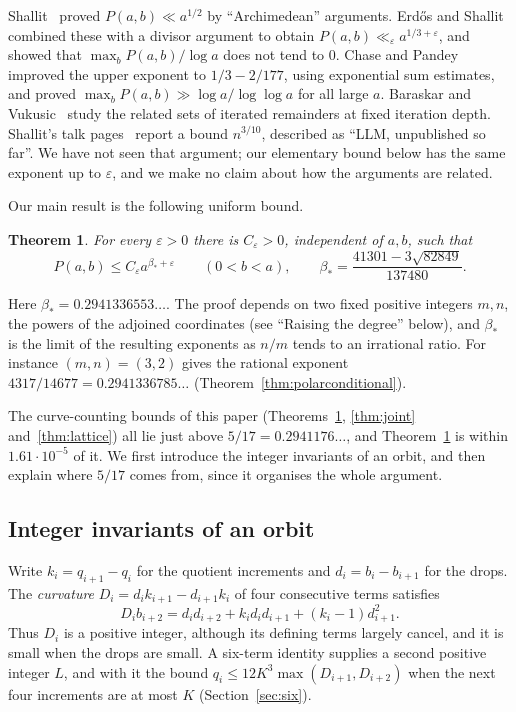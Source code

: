 \documentclass[11pt]{article}
\newtheorem{theorem}{Theorem}[section]
\theoremstyle{definition}
\theoremstyle{remark}
\begin{document}
Shallit~\cite{Shallit86} proved $P(a,b)\ll a^{1/2}$ by ``Archimedean'' arguments.
Erd\H{o}s and Shallit~\cite{ES} combined these with a divisor argument to obtain
$P(a,b)\ll_\varepsilon a^{1/3+\varepsilon}$, and showed that
$\max_bP(a,b)/\log a$ does not tend to $0$. Chase and Pandey~\cite{CP} improved
the upper exponent to $1/3-2/177$, using exponential sum estimates, and proved
$\max_bP(a,b)\gg\log a/\log\log a$ for all large $a$.
Baraskar and Vukusic~\cite{BV} study the related sets of iterated remainders
at fixed iteration depth. Shallit's talk pages~\cite{ShallitTalks} report a
bound $n^{3/10}$, described as ``LLM, unpublished so far''. We have not seen
that argument; our elementary bound below has the same exponent up to
$\varepsilon$, and we make no claim about how the arguments are related.

Our main result is the following uniform bound.
\begin{theorem}\label{thm:polar}
For every $\varepsilon>0$ there is $C_\varepsilon>0$, independent of $a,b$, such that
\[
 P(a,b)\le C_\varepsilon a^{\beta_*+\varepsilon}\qquad(0<b<a),\qquad
 \beta_*=\frac{41301-3\sqrt{82849}}{137480}.
\]
\end{theorem}
Here $\beta_*=0.2941336553\ldots$. The proof depends on two fixed positive
integers $m,n$, the powers of the adjoined coordinates (see ``Raising the
degree'' below), and $\beta_*$ is the limit of the resulting exponents as
$n/m$ tends to an irrational ratio. For instance $(m,n)=(3,2)$ gives the
rational exponent $4317/14677=0.2941336785\ldots$
(Theorem~\ref{thm:polarconditional}).

The curve-counting bounds of this paper (Theorems~\ref{thm:polar},
\ref{thm:joint} and~\ref{thm:lattice}) all lie just above
$5/17=0.2941176\ldots$, and Theorem~\ref{thm:polar} is within
$1.61\cdot10^{-5}$ of it. We first introduce the integer invariants of an
orbit, and then explain where $5/17$ comes from, since it organises the whole
argument.

\subsection*{Integer invariants of an orbit}
Write $k_i=q_{i+1}-q_i$ for the quotient increments and
$d_i=b_i-b_{i+1}$ for the drops. The \emph{curvature}
$D_i=d_ik_{i+1}-d_{i+1}k_i$ of four consecutive terms satisfies
\begin{equation}\label{eq:intro-curv}
 D_ib_{i+2}=d_id_{i+2}+k_id_id_{i+1}+(k_i-1)d_{i+1}^2.
\end{equation}
Thus $D_i$ is a positive integer, although its defining terms largely cancel,
and it is small when the drops are small. A six-term identity supplies a
second positive integer $L$, and with it the bound
$q_i\le12K^3\max(D_{i+1},D_{i+2})$ when the next four increments are at
most $K$ (Section~\ref{sec:six}).
\end{document}
